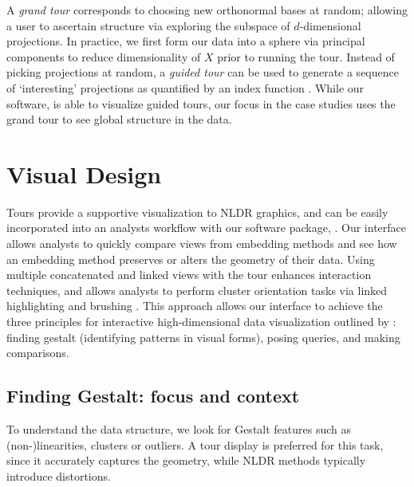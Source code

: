 \documentclass[article,notitle]{jdssv}
\begin{document}
A \emph{grand tour} corresponds to choosing new orthonormal
bases at random; allowing a user to ascertain structure via exploring the
subspace of \(d\)-dimensional projections. In practice, we first form our data into a sphere via principal components to reduce dimensionality of \(X\) prior to running the tour. Instead of picking projections at random, a \emph{guided tour} can be used to generate a sequence of `interesting'
projections as quantified by an index function \citep{Cook1995-bi}. While our software, is able to visualize guided tours, our focus in the case studies uses the grand tour to see global structure in the data.

\hypertarget{visual-design}{%
\section{Visual Design}\label{visual-design}}

Tours provide a supportive visualization to NLDR graphics, and
can be easily incorporated into an analysts workflow with our software package,
. Our interface allows analysts to quickly compare
views from embedding methods and see how an embedding method
preserves or alters the geometry of their data. Using multiple concatenated and
linked views with the tour enhances interaction techniques, and allows
analysts to perform cluster orientation tasks via linked highlighting and
brushing \citep{McDonald1982-ew, Becker1987-gd}.
This approach allows our interface to achieve
the three principles for interactive high-dimensional data visualization outlined
by \citet{Buja1996-fk}: finding gestalt (identifying patterns in visual forms), posing queries, and making comparisons.

\hypertarget{finding-gestalt-focus-and-context}{%
\subsection{Finding Gestalt: focus and context}\label{finding-gestalt-focus-and-context}}

To understand the data structure, we look for Gestalt features such as
(non-)linearities, clusters or outliers. A tour display is
preferred for this task, since it accurately captures the geometry, while NLDR
methods typically introduce distortions.
\end{document}
